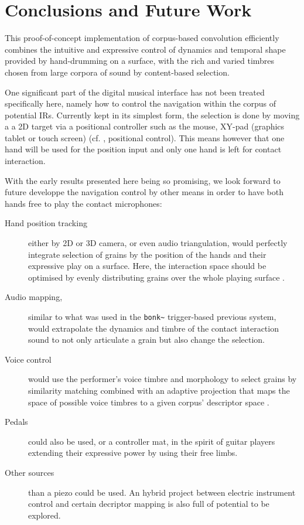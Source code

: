 \section{Conclusions and Future Work}\label{sec:future}

This proof-of-concept implementation of corpus-based convolution efficiently combines the intuitive and expressive control of dynamics and temporal shape provided by hand-drumming on a surface, with the rich and varied timbres chosen from large corpora of sound by content-based selection.


One significant part of the digital musical interface has not been treated specifically here, namely how to control the navigation within the corpus of potential IRs. Currently kept in its simplest form, the selection is done by moving a a 2D target via a positional controller such as the mouse, XY-pad (graphics tablet or touch screen) (cf. \cite{Schwarz-nime2012-sound-space}, positional control).
This means however that one hand will be used for the position input and only one hand is left for contact interaction.

With the early results presented here being so promising, we look forward to future developpe the navigation control by other means in order to have both hands free to play the contact microphones:

\begin{description}
\item[Hand position tracking] either by 2D or 3D camera, or even audio triangulation, would perfectly integrate selection of grains by the position of the hands and their expressive play on a surface.  Here, the interaction space should be optimised by evenly distributing grains over the whole playing surface \cite{LallemandSchwarz-dafx2011-distribute}.
\item[Audio mapping,] similar to what was used in the \verb|bonk~| trigger-based previous system, would extrapolate the dynamics and timbre of the contact interaction sound to not only articulate a grain but also change the selection.
\item[Voice control] would use the performer's voice timbre and morphology to select grains by similarity matching combined with an adaptive projection that maps the space of possible voice timbres to a given corpus' descriptor space \cite{StowellPlumbley-smc2010-timbre-remapping-regression-tree,Fasciani-si2013b}.
\item[Pedals] could also be used, or a controller mat, in the spirit of guitar players extending their expressive power by using their free limbs.
\item[Other sources] than a piezo could be used. An hybrid project between electric instrument control and certain decriptor mapping is also full of potential to be explored.
\end{description}

